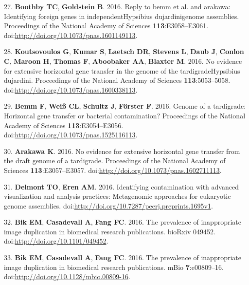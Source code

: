 \documentclass[11pt,]{article}
\begin{document}
27. \textbf{Boothby TC}, \textbf{Goldstein B}. 2016. Reply to bemm et
al. and arakawa: Identifying foreign genes in independentHypsibius
dujardinigenome assemblies. Proceedings of the National Academy of
Sciences \textbf{113}:E3058--E3061.
doi:\url{http://doi.org/10.1073/pnas.1601149113}.

28. \textbf{Koutsovoulos G}, \textbf{Kumar S}, \textbf{Laetsch DR},
\textbf{Stevens L}, \textbf{Daub J}, \textbf{Conlon C}, \textbf{Maroon
H}, \textbf{Thomas F}, \textbf{Aboobaker AA}, \textbf{Blaxter M}. 2016.
No evidence for extensive horizontal gene transfer in the genome of the
tardigradeHypsibius dujardini. Proceedings of the National Academy of
Sciences \textbf{113}:5053--5058.
doi:\url{http://doi.org/10.1073/pnas.1600338113}.

29. \textbf{Bemm F}, \textbf{Weiß CL}, \textbf{Schultz J},
\textbf{Förster F}. 2016. Genome of a tardigrade: Horizontal gene
transfer or bacterial contamination? Proceedings of the National Academy
of Sciences \textbf{113}:E3054--E3056.
doi:\url{http://doi.org/10.1073/pnas.1525116113}.

30. \textbf{Arakawa K}. 2016. No evidence for extensive horizontal gene
transfer from the draft genome of a tardigrade. Proceedings of the
National Academy of Sciences \textbf{113}:E3057--E3057.
doi:\url{http://doi.org/10.1073/pnas.1602711113}.

31. \textbf{Delmont TO}, \textbf{Eren AM}. 2016. Identifying
contamination with advanced visualization and analysis practices:
Metagenomic approaches for eukaryotic genome assemblies.
doi:\url{http://doi.org/10.7287/peerj.preprints.1695v1}.

32. \textbf{Bik EM}, \textbf{Casadevall A}, \textbf{Fang FC}. 2016. The
prevalence of inappropriate image duplication in biomedical research
publications. bioRxiv 049452. doi:\url{http://doi.org/10.1101/049452}.

33. \textbf{Bik EM}, \textbf{Casadevall A}, \textbf{Fang FC}. 2016. The
prevalence of inappropriate image duplication in biomedical research
publications. mBio \textbf{7}:e00809--16.
doi:\url{http://doi.org/10.1128/mbio.00809-16}.
\end{document}
